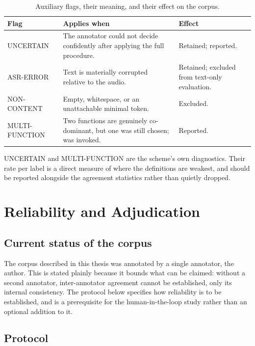 \begin{table}[htbp]
\centering
\small
\caption{Auxiliary flags, their meaning, and their effect on the corpus.}
\label{tab:flags}
\renewcommand{\arraystretch}{1.35}
\begin{tabularx}{\textwidth}{@{}l X l@{}}
\toprule
\textbf{Flag} & \textbf{Applies when} & \textbf{Effect} \\
\midrule
\textsf{UNCERTAIN} & The annotator could not decide confidently after applying the full procedure. & Retained; reported. \\
\textsf{ASR-ERROR} & Text is materially corrupted relative to the audio. & Retained; excluded from text-only evaluation. \\
\textsf{NON-CONTENT} & Empty, whitespace, or an unattachable minimal token. & Excluded. \\
\textsf{MULTI-FUNCTION} & Two functions are genuinely co-dominant, but one was still chosen; \R{precedence} was invoked. & Reported. \\
\bottomrule
\end{tabularx}
\end{table}

\noindent \textsf{UNCERTAIN} and \textsf{MULTI-FUNCTION} are the scheme's own diagnostics. Their rate per label is a direct measure of where the definitions are weakest, and should be reported alongside the
agreement statistics rather than quietly dropped.

\section{Reliability and Adjudication}
\label{sec:iaa}

\subsection{Current status of the corpus}

The corpus described in this thesis was annotated by a single annotator, the author. This is stated plainly because it bounds what can be claimed: without a second annotator, inter-annotator agreement cannot be established, only its internal consistency. The protocol below specifies how reliability is to be established, and is a prerequisite for the human-in-the-loop study rather than an optional addition to it.

\subsection{Protocol}

